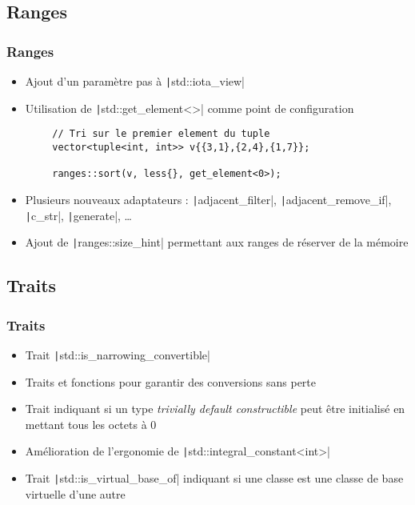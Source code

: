 \documentclass[C++.tex]{subfiles}
\begin{document}
\subsection*{Ranges}
\begin{frame}[fragile]
	\frametitle{Ranges}
	\begin{itemize}
		\item Ajout d'un paramètre \og pas\fg{} à \texttt|std::iota_view|
		\item Utilisation de \texttt|std::get_element<>| comme point de configuration
	\end{itemize}

	\begin{verbatim}
		// Tri sur le premier element du tuple
		vector<tuple<int, int>> v{{3,1},{2,4},{1,7}};

		ranges::sort(v, less{}, get_element<0>);
	\end{verbatim}

	\begin{itemize}
		\item Plusieurs nouveaux adaptateurs : \texttt|adjacent_filter|, \texttt|adjacent_remove_if|, \texttt|c_str|, \texttt|generate|, \ldots
		\item Ajout de \texttt|ranges::size_hint| permettant aux ranges de réserver de la mémoire
	\end{itemize}
\end{frame}

\subsection*{Traits}
\begin{frame}[fragile]
	\frametitle{Traits}
	\begin{itemize}
		\item Trait \texttt|std::is_narrowing_convertible|
		\item Traits et fonctions pour garantir des conversions sans perte
		\item Trait indiquant si un type \textit{trivially default constructible} peut être initialisé en mettant tous les octets à 0
		\item Amélioration de l'ergonomie de \texttt|std::integral_constant<int>|
		\item Trait \texttt|std::is_virtual_base_of| indiquant si une classe est une classe de base virtuelle d'une autre
	\end{itemize}
\end{frame}
\end{document}
